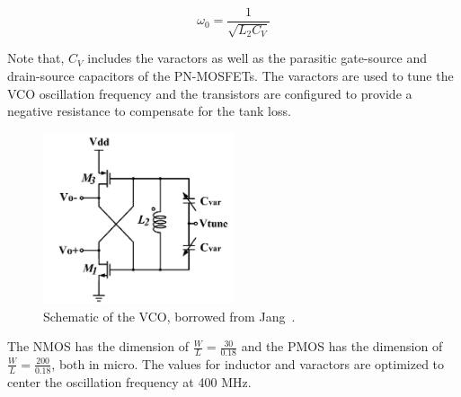 \begin{equation}
\omega_{0} = \frac{1}{\sqrt{L_2C_V}}
\end{equation}

Note that, $C_V$ includes the varactors as well as the parasitic gate-source and drain-source capacitors of the PN-MOSFETs. The varactors are used to tune the VCO oscillation frequency and the transistors are configured to provide a negative resistance to compensate for the tank loss. 

\begin{figure}[h]
   \centering
    \includegraphics[width=0.50\textwidth]{figures/VCO.png}
    \caption{Schematic of the VCO, borrowed from Jang~\cite{vco}.}
    \label{fig:vco}
\end{figure}


The NMOS has the dimension of $\frac{W}{L}=\frac{30}{0.18}$ and the PMOS has the dimension of $\frac{W}{L}=\frac{200}{0.18}$, both in micro. The values for inductor and varactors are optimized to center the oscillation frequency at 400 MHz.

